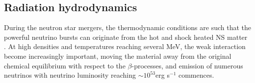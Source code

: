 %
%
%


\subsection{Radiation hydrodynamics}

During the neutron star mergers, the thermodynamic conditions are such that the powerful 
neutrino bursts can originate from the hot and shock heated NS matter \citep[\eg][]{Sekiguchi:2011zd}.
At high densities and temperatures reaching several MeV, the weak interaction become increasingly important,
moving the material away from the original chemical equilibrium with respect to the 
$\beta$-processes, and emission of numerous neutrinos with neutrino luminosity 
reaching $\sim10^{53}$erg s$^{-1}$ commences. 

